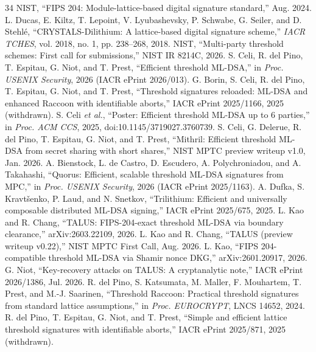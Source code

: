 \documentclass[10pt,conference,a4paper]{IEEEtran}
\begin{document}
\begin{thebibliography}{34}\footnotesize
{} NIST, ``FIPS 204: Module-lattice-based digital signature standard,'' Aug. 2024.
 L. Ducas, E. Kiltz, T. Lepoint, V. Lyubashevsky, P. Schwabe, G. Seiler, and D. Stehl\'e, ``CRYSTALS-Dilithium: A lattice-based digital signature scheme,'' \emph{IACR TCHES}, vol. 2018, no. 1, pp. 238--268, 2018.
 NIST, ``Multi-party threshold schemes: First call for submissions,'' NIST IR 8214C, 2026.
 S. Celi, R. del Pino, T. Espitau, G. Niot, and T. Prest, ``Efficient threshold ML-DSA,'' in \emph{Proc. USENIX Security}, 2026 (IACR ePrint 2026/013).
 G. Borin, S. Celi, R. del Pino, T. Espitau, G. Niot, and T. Prest, ``Threshold signatures reloaded: ML-DSA and enhanced Raccoon with identifiable aborts,'' IACR ePrint 2025/1166, 2025 (withdrawn).
 S. Celi \emph{et al.}, ``Poster: Efficient threshold ML-DSA up to 6 parties,'' in \emph{Proc. ACM CCS}, 2025, doi:10.1145/3719027.3760739.
 S. Celi, G. Delerue, R. del Pino, T. Espitau, G. Niot, and T. Prest, ``Mithril: Efficient threshold ML-DSA from secret sharing with short shares,'' NIST MPTC preview writeup v1.0, Jan. 2026.
 A. Bienstock, L. de Castro, D. Escudero, A. Polychroniadou, and A. Takahashi, ``Quorus: Efficient, scalable threshold ML-DSA signatures from MPC,'' in \emph{Proc. USENIX Security}, 2026 (IACR ePrint 2025/1163).
 A. Dufka, S. Kravt\v{s}enko, P. Laud, and N. Snetkov, ``Trilithium: Efficient and universally composable distributed ML-DSA signing,'' IACR ePrint 2025/675, 2025.
 L. Kao and R. Chang, ``TALUS: FIPS-204-exact threshold ML-DSA via boundary clearance,'' arXiv:2603.22109, 2026.
 L. Kao and R. Chang, ``TALUS (preview writeup v0.22),'' NIST MPTC First Call, Aug. 2026.
 L. Kao, ``FIPS 204-compatible threshold ML-DSA via Shamir nonce DKG,'' arXiv:2601.20917, 2026.
 G. Niot, ``Key-recovery attacks on TALUS: A cryptanalytic note,'' IACR ePrint 2026/1386, Jul. 2026.
 R. del Pino, S. Katsumata, M. Maller, F. Mouhartem, T. Prest, and M.-J. Saarinen, ``Threshold Raccoon: Practical threshold signatures from standard lattice assumptions,'' in \emph{Proc. EUROCRYPT}, LNCS 14652, 2024.
 R. del Pino, T. Espitau, G. Niot, and T. Prest, ``Simple and efficient lattice threshold signatures with identifiable aborts,'' IACR ePrint 2025/871, 2025 (withdrawn).

\end{thebibliography}
\end{document}
